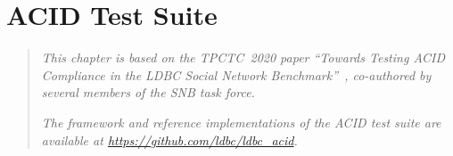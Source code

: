\chapter{ACID Test Suite}
\label{sec:acid-test-suite}

\newcommand{\bl}[1]{\textcolor{blue}{#1}}
\newcommand{\rd}[1]{\textcolor{red}{#1}}
\newcommand{\gn}[1]{\textcolor{green}{#1}}
\newcommand{\gy}[1]{\textcolor{grey}{\textit{#1}}}

\newcommand{\level}[1]{\textsf{#1}}
\newcommand{\anomaly}[1]{\rd{#1}}
\newcommand{\anolong}[1]{\emph{\rd{#1}}}
\newcommand{\tx}[1]{#1}

\newcommand{\cmark}{\ding{51}}
\newcommand{\xmark}{\ding{55}}


\begin{quote}
  \textit{This chapter is based on the TPCTC~2020 paper ``Towards Testing ACID Compliance in the LDBC Social Network Benchmark''~\cite{DBLP:conf/tpctc/WaudbySKMBS20}, co-authored by several members of the SNB task force.}

  \textit{The framework and reference implementations of the ACID test suite are available at \url{https://github.com/ldbc/ldbc_acid}.}
\end{quote}

